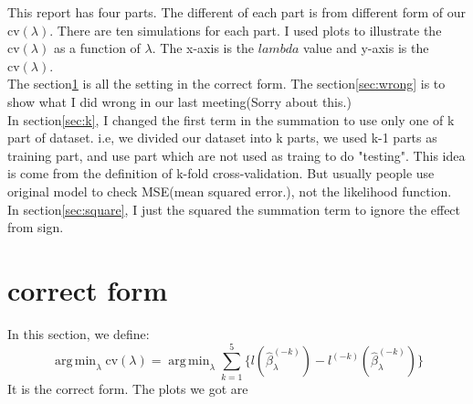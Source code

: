 \documentclass[letterpaper]{article}
\DeclareMathOperator*{\argmin}{arg\,min}
\begin{document}
This report has four parts. The different of each part is from different form of our $\text{cv}(\lambda)$. There are ten simulations for each part. I used plots to illustrate the $\text{cv}(\lambda)$ as a function of $\lambda$. The x-axis is the $lambda$ value and y-axis is the $\text{cv}(\lambda)$.\\
The section\ref{sec:correct} is all the setting in the correct form. The section\ref{sec:wrong} is to show what I did wrong in our last meeting(Sorry about this.)\\
In section\ref{sec:k}, I changed the first term in the summation to use only one of k part of dataset. i.e, we divided our dataset into k parts, we used k-1 parts as training part, and use part which are not used as traing to do "testing". This idea is come from the definition of k-fold cross-validation. But usually people use original model to check MSE(mean squared error.), not the likelihood function.\\
In section\ref{sec:square}, I just the squared the summation term to ignore the effect from sign.
\section{correct form}
\label{sec:correct}
In this section, we define:
$$
\argmin_{\lambda}\text{cv}(\lambda)=\argmin_{\lambda}\sum_{k=1}^5\{l(\hat{\beta}_\lambda^{(-k)})-l^{(-k)}(\hat{\beta}_\lambda^{(-k)})\}
$$
It is the correct form.
The plots we got are
\end{document}
